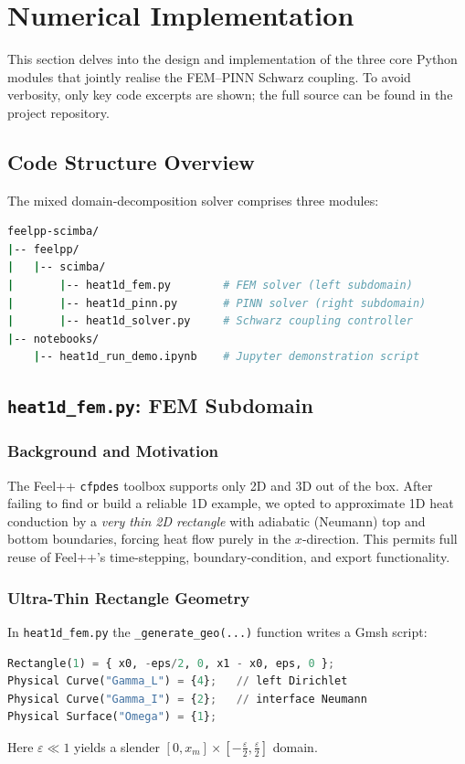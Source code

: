\documentclass[12pt]{article}
\begin{document}
\section{Numerical Implementation}

This section delves into the design and implementation of the three core Python modules that jointly realise the FEM–PINN Schwarz coupling.  To avoid verbosity, only key code excerpts are shown; the full source can be found in the project repository.\cite{noauthor_feelppfeelpp-scimba_nodate}

\subsection{Code Structure Overview}

The mixed domain‐decomposition solver comprises three modules:
\begin{lstlisting}[language=bash]
feelpp-scimba/
|-- feelpp/
|   |-- scimba/
|       |-- heat1d_fem.py        # FEM solver (left subdomain)
|       |-- heat1d_pinn.py       # PINN solver (right subdomain)
|       |-- heat1d_solver.py     # Schwarz coupling controller
|-- notebooks/
    |-- heat1d_run_demo.ipynb    # Jupyter demonstration script
\end{lstlisting}


\subsection{\texttt{heat1d\_fem.py}: FEM Subdomain}

\subsubsection{Background and Motivation}

The Feel++ \texttt{cfpdes} toolbox supports only 2D and 3D out of the box.  After failing to find or build a reliable 1D example, we opted to approximate 1D heat conduction by a \emph{very thin 2D rectangle} with adiabatic (Neumann) top and bottom boundaries, forcing heat flow purely in the \(x\)-direction.  This permits full reuse of Feel++’s time-stepping, boundary‐condition, and export functionality.

\subsubsection{Ultra-Thin Rectangle Geometry}

In \texttt{heat1d\_fem.py} the \verb|_generate_geo(...)| function writes a Gmsh script:
\begin{lstlisting}[language=Python, caption={Gmsh rectangle geometry}]
Rectangle(1) = { x0, -eps/2, 0, x1 - x0, eps, 0 };
Physical Curve("Gamma_L") = {4};   // left Dirichlet
Physical Curve("Gamma_I") = {2};   // interface Neumann
Physical Surface("Omega") = {1};
\end{lstlisting}
Here \(\varepsilon\ll1\) yields a slender \([0,x_m]\times[-\tfrac\varepsilon2,\tfrac\varepsilon2]\) domain.
\end{document}
